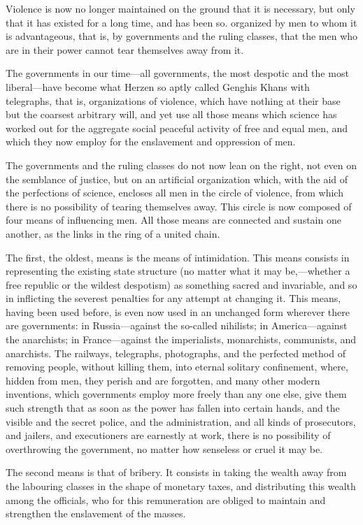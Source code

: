 \documentclass{book}
\begin{document}
Violence is now no longer maintained on the ground that it is necessary, but only that it has existed for a long time, and has been so. organized by men to whom it is advantageous, that is, by governments and the ruling classes, that the men who are in their power cannot tear themselves away from it.

The governments in our time—all governments, the most despotic and the most liberal—have become what Herzen so aptly called Genghis Khans with telegraphs, that is, organizations of violence, which have nothing at their base but the coarsest arbitrary will, and yet use all those means which science has worked out for the aggregate social peaceful activity of free and equal men, and which they now employ for the enslavement and oppression of men.

The governments and the ruling classes do not now lean on the right, not even on the semblance of justice, but on an artificial organization which, with the aid of the perfections of science, encloses all men in the circle of violence, from which there is no possibility of tearing themselves away. This circle is now composed of four means of influencing men. All those means are connected and sustain one another, as the links in the ring of a united chain.

The first, the oldest, means is the means of intimidation. This means consists in representing the existing state structure (no matter what it may be,—whether a free republic or the wildest despotism) as something sacred and invariable, and so in inflicting the severest penalties for any attempt at changing it. This means, having been used before, is even now used in an unchanged form wherever there are governments: in Russia—against the so-called nihilists; in America—against the anarchists; in France—against the imperialists, monarchists, communists, and anarchists. The railways, telegraphs, photographs, and the perfected method of removing people, without killing them, into eternal solitary confinement, where, hidden from men, they perish and are forgotten, and many other modern inventions, which governments employ more freely than any one else, give them such strength that as soon as the power has fallen into certain hands, and the visible and the secret police, and the administration, and all kinds of prosecutors, and jailers, and executioners are earnestly at work, there is no possibility of overthrowing the government, no matter how senseless or cruel it may be.

The second means is that of bribery. It consists in taking the wealth away from the labouring classes in the shape of monetary taxes, and distributing this wealth among the officials, who for this remuneration are obliged to maintain and strengthen the enslavement of the masses.
\end{document}
